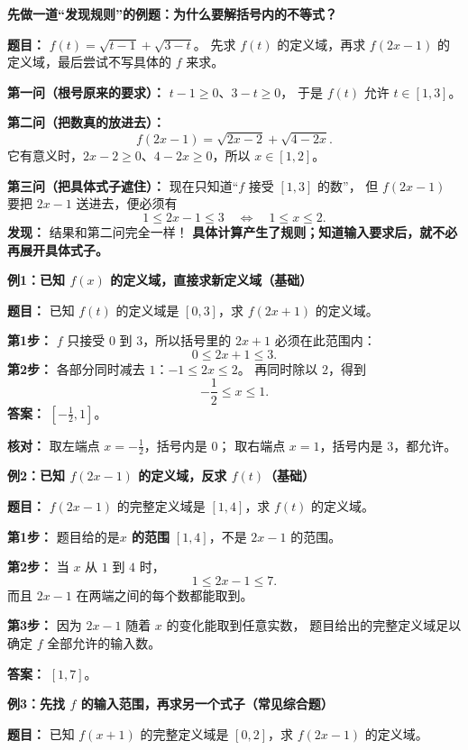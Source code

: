 \clearpage
\begin{examplebox}
\textbf{\textcolor{CExample}{先做一道“发现规则”的例题：为什么要解括号内的不等式？}}

\textbf{题目：} $f(t)=\sqrt{t-1}+\sqrt{3-t}$。
先求 $f(t)$ 的定义域，再求 $f(2x-1)$ 的定义域，最后尝试不写具体的 $f$ 来求。

\textbf{第一问（根号原来的要求）：} $t-1\ge0$、$3-t\ge0$，
于是 $f(t)$ 允许 $t\in[1,3]$。

\textbf{第二问（把数真的放进去）：}
\[
 f(2x-1)=\sqrt{2x-2}+\sqrt{4-2x}.
\]
它有意义时，$2x-2\ge0$、$4-2x\ge0$，所以 $x\in[1,2]$。

\textbf{第三问（把具体式子遮住）：} 现在只知道“$f$ 接受 $[1,3]$ 的数”，
但 $f(2x-1)$ 要把 $2x-1$ 送进去，便必须有
\[
 1\le2x-1\le3
 \quad\Longleftrightarrow\quad \boxed{1\le x\le2}.
\]
\textbf{发现：} 结果和第二问完全一样！
\textbf{具体计算产生了规则；知道输入要求后，就不必再展开具体式子。}

\medskip

\textbf{\textcolor{CExample}{例1：已知 $f(x)$ 的定义域，直接求新定义域（基础）}}

\textbf{题目：} 已知 $f(t)$ 的定义域是 $[0,3]$，求 $f(2x+1)$ 的定义域。

\textbf{第1步：} $f$ 只接受 $0$ 到 $3$，所以括号里的 $2x+1$ 必须在此范围内：
\[
 0\le2x+1\le3.
\]
\textbf{第2步：} 各部分同时减去 $1$：$-1\le2x\le2$。
再同时除以 $2$，得到
\[
 -\frac12\le x\le1.
\]
\textbf{答案：} $\boxed{[-\frac12,1]}$。

\textbf{核对：} 取左端点 $x=-\frac12$，括号内是 $0$；
取右端点 $x=1$，括号内是 $3$，都允许。

\medskip
\textbf{\textcolor{CExample}{例2：已知 $f(2x-1)$ 的定义域，反求 $f(t)$（基础）}}

\textbf{题目：} $f(2x-1)$ 的完整定义域是 $[1,4]$，求 $f(t)$ 的定义域。

\textbf{第1步：} 题目给的是\textbf{$x$ 的范围} $[1,4]$，不是 $2x-1$ 的范围。

\textbf{第2步：} 当 $x$ 从 $1$ 到 $4$ 时，
\[
 1\le2x-1\le7.
\]
而且 $2x-1$ 在两端之间的每个数都能取到。

\textbf{第3步：} 因为 $2x-1$ 随着 $x$ 的变化能取到任意实数，
题目给出的完整定义域足以确定 $f$ 全部允许的输入数。

\textbf{答案：} $\boxed{[1,7]}$。

\medskip
\textbf{\textcolor{CExample}{例3：先找 $f$ 的输入范围，再求另一个式子（常见综合题）}}

\textbf{题目：} 已知 $f(x+1)$ 的完整定义域是 $[0,2]$，求 $f(2x-1)$ 的定义域。


\end{examplebox}

